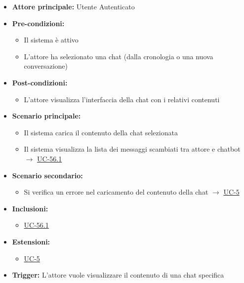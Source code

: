 \documentclass[a4paper,12pt]{article}
\newcommand{\ignoreglossary}{}
\begin{document}
\begin{itemize}
    \item \textbf{Attore principale:} Utente Autenticato
    \item \textbf{Pre-condizioni:}
    \begin{itemize}
        \item Il sistema è attivo
        \item L'attore ha selezionato una chat (dalla cronologia o una nuova conversazione)
    \end{itemize}
    \item \textbf{Post-condizioni:} 
    \begin{itemize}
        \item L'attore visualizza l'interfaccia della chat con i relativi contenuti
    \end{itemize}
    \item \textbf{Scenario principale:} 
    \begin{itemize}
        \item Il sistema carica il contenuto della chat selezionata
        \item Il sistema visualizza la lista dei messaggi scambiati tra attore e chatbot $\rightarrow$ \hyperref[subsec:UC-56.1]{UC-56.1}
    \end{itemize}
    \item \textbf{Scenario secondario:} 
    \begin{itemize}
        \item Si \ignoreglossary{verifica} un errore nel caricamento del contenuto della chat $\rightarrow$ \hyperref[sec:UC-5]{UC-5}
    \end{itemize}
    \item \textbf{Inclusioni:} 
    \begin{itemize}
        \item \hyperref[subsec:UC-56.1]{UC-56.1}
    \end{itemize}
    \item \textbf{Estensioni:} 
    \begin{itemize}
        \item \hyperref[sec:UC-5]{UC-5}
    \end{itemize}
    \item \textbf{Trigger:} L'attore vuole visualizzare il contenuto di una chat specifica
\end{itemize}
\end{document}
